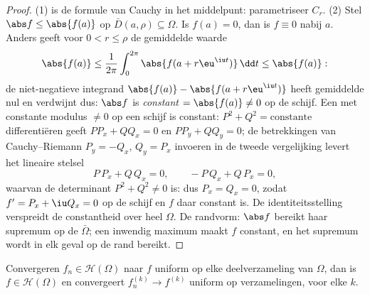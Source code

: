 \begin{proof}
(1) is de formule van Cauchy in het middelpunt: parametriseer
$C_r$.
(2) Stel $\abs f \leq \abs{f(a)}$ op $\bar D(a, \rho) \subseteq
\Omega$. Is $f(a) = 0$, dan is $f \equiv 0$ nabij $a$. Anders
geeft voor $0 < r \leq \rho$ de gemiddelde waarde
\[
\abs{f(a)} \leq \frac1{2\pi}\int_0^{2\pi}\abs{f(a +
r\eu^{\iu t})}\,\dd t \leq \abs{f(a)} :
\]
de  niet-negatieve integrand $\abs{f(a)} - \abs{f(a +
r\eu^{\iu t})}$ heeft gemiddelde nul en verdwijnt dus: $\abs f$
is \emph{constant} $= \abs{f(a)} \ne 0$ op de schijf. Een
 met constante modulus $\neq 0$ op een schijf is
constant: $P^2 + Q^2 = \text{constante}$ differentiëren geeft
$PP_x + QQ_x = 0$ en $PP_y + QQ_y = 0$; de betrekkingen van
Cauchy--Riemann $P_y = -Q_x$, $Q_y = P_x$ invoeren in de tweede
vergelijking levert het lineaire stelsel
\[
P\,P_x + Q\,Q_x = 0, \qquad -P\,Q_x + Q\,P_x = 0,
\]
waarvan de determinant $P^2 + Q^2 \neq 0$ is: dus $P_x = Q_x =
0$, zodat $f' = P_x + \iu Q_x = 0$ op de schijf en $f$ daar
constant is. De identiteitsstelling verspreidt de constantheid
over heel $\Omega$. De randvorm: $\abs f$ bereikt haar supremum
op de  $\bar\Omega$; een inwendig maximum maakt $f$
constant, en het supremum wordt in elk geval op de rand bereikt.
\end{proof}

\begin{theorem}
\label{thm:b3:holomorphic:weierstrassconv}
Convergeren $f_n \in \mathcal H(\Omega)$ naar $f$ uniform op elke
 deelverzameling van $\Omega$, dan is $f \in \mathcal
H(\Omega)$ en convergeert $f_n^{(k)} \to f^{(k)}$ uniform op
 verzamelingen, voor elke
$k$.
\end{theorem}

